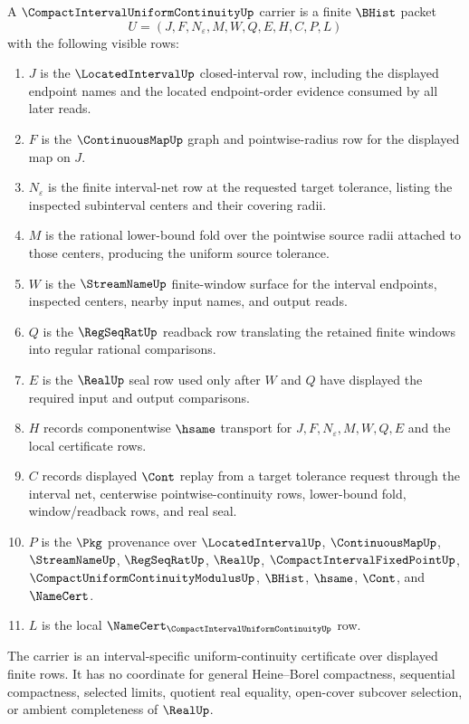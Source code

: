 \begin{definition}
\label{def:compact-interval-uniform-continuity-carrier}
A $\CompactIntervalUniformContinuityUp$ carrier is a finite $\BHist$ packet
$$
U=(J,F,N_\varepsilon,M,W,Q,E,H,C,P,L)
$$
with the following visible rows:
\begin{enumerate}
\item $J$ is the $\LocatedIntervalUp$ closed-interval row, including the
displayed endpoint names and the located endpoint-order evidence consumed by
all later reads.
\item $F$ is the $\ContinuousMapUp$ graph and pointwise-radius row for the
displayed map on $J$.
\item $N_\varepsilon$ is the finite interval-net row at the requested target
tolerance, listing the inspected subinterval centers and their covering
radii.
\item $M$ is the rational lower-bound fold over the pointwise source radii
attached to those centers, producing the uniform source tolerance.
\item $W$ is the $\StreamNameUp$ finite-window surface for the interval
endpoints, inspected centers, nearby input names, and output reads.
\item $Q$ is the $\RegSeqRatUp$ readback row translating the retained finite
windows into regular rational comparisons.
\item $E$ is the $\RealUp$ seal row used only after $W$ and $Q$ have displayed
the required input and output comparisons.
\item $H$ records componentwise $\hsame$ transport for $J,F,N_\varepsilon,M,W,Q,E$
and the local certificate rows.
\item $C$ records displayed $\Cont$ replay from a target tolerance request
through the interval net, centerwise pointwise-continuity rows, lower-bound
fold, window/readback rows, and real seal.
\item $P$ is the $\Pkg$ provenance over $\LocatedIntervalUp$,
$\ContinuousMapUp$, $\StreamNameUp$, $\RegSeqRatUp$, $\RealUp$,
$\CompactIntervalFixedPointUp$, $\CompactUniformContinuityModulusUp$,
$\BHist$, $\hsame$, $\Cont$, and $\NameCert$.
\item $L$ is the local $\NameCert_{\CompactIntervalUniformContinuityUp}$ row.
\end{enumerate}
The carrier is an interval-specific uniform-continuity certificate over
displayed finite rows. It has no coordinate for general Heine--Borel
compactness, sequential compactness, selected limits, quotient real equality,
open-cover subcover selection, or ambient completeness of $\RealUp$.
\end{definition}

